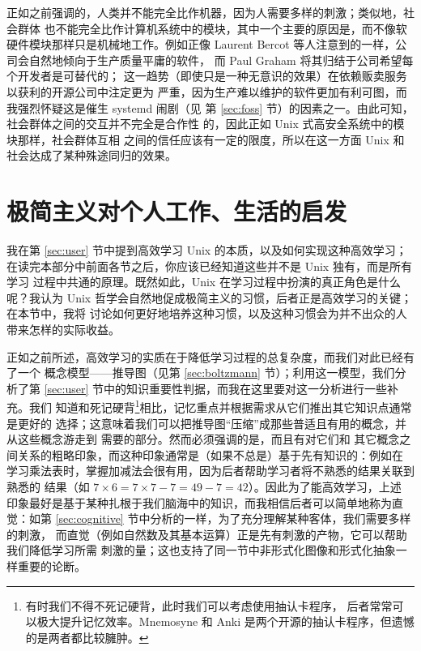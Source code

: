 正如之前强调的，人类并不能完全比作机器，因为人需要多样的刺激；类似地，社会群体
也不能完全比作计算机系统中的模块，其中一个主要的原因是，而不像软硬件模块那样只是机械地工作。例如正像 Laurent Bercot
等人注意到的一样，公司会自然地倾向于生产质量平庸的软件，
而 Paul Graham 将其归结于公司希望每个开发者是可替代的；
这一趋势（即使只是一种无意识的效果）在依赖贩卖服务以获利的开源公司中注定更为
严重，因为生产难以维护的软件更加有利可图，而我强烈怀疑这是催生 systemd 闹剧（见
第 \ref{sec:foss} 节）的因素之一。由此可知，社会群体之间的交互并不完全是合作性
的，因此正如 Unix 式高安全系统中的模块那样，社会群体互相
之间的信任应该有一定的限度，所以在这一方面 Unix 和社会达成了某种殊途同归的效果。

\section{极简主义对个人工作、生活的启发}\label{sec:worklife}

我在第 \ref{sec:user} 节中提到高效学习 Unix 的本质，以及如何实现这种高效学习；
在读完本部分中前面各节之后，你应该已经知道这些并不是 Unix 独有，而是所有学习
过程中共通的原理。既然如此，Unix 在学习过程中扮演的真正角色是什么呢？我认为
Unix 哲学会自然地促成极简主义的习惯，后者正是高效学习的关键；在本节中，我将
讨论如何更好地培养这种习惯，以及这种习惯会为并不出众的人带来怎样的实际收益。

正如之前所述，高效学习的实质在于降低学习过程的总复杂度，而我们对此已经有了一个
概念模型——推导图（见第 \ref{sec:boltzmann} 节）；利用这一模型，我们分析了第
\ref{sec:user} 节中的知识重要性判据，而我在这里要对这一分析进行一些补充。我们
知道和死记硬背\footnote{有时我们不得不死记硬背，此时我们可以考虑使用抽认卡程序，
后者常常可以极大提升记忆效率。Mnemosyne 和 Anki 是两个开源的抽认卡程序，但遗憾
的是两者都比较臃肿。}相比，记忆重点并根据需求从它们推出其它知识点通常是更好的
选择；这意味着我们可以把推导图“压缩”成那些普适且有用的概念，并从这些概念游走到
需要的部分。然而必须强调的是，而且有对它们和
其它概念之间关系的粗略印象，而这种印象通常是（如果不总是）基于先有知识的：例如在
学习乘法表时，掌握加减法会很有用，因为后者帮助学习者将不熟悉的结果关联到熟悉的
结果（如 $7 \times 6 = 7 \times 7 - 7 = 49 - 7 = 42$）。因此为了能高效学习，上述
印象最好是基于某种扎根于我们脑海中的知识，而我相信后者可以简单地称为直觉：如第
\ref{sec:cognitive} 节中分析的一样，为了充分理解某种客体，我们需要多样的刺激，
而直觉（例如自然数及其基本运算）正是先有刺激的产物，它可以帮助我们降低学习所需
刺激的量；这也支持了同一节中非形式化图像和形式化抽象一样重要的论断。


